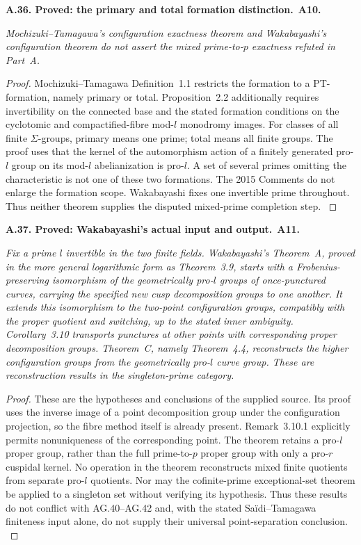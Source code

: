 \documentclass[11pt,a4paper]{article}
\newenvironment{claim}[3]{\par\medskip\noindent\hypertarget{#1}{\textbf{#1. #2.}}\ \textbf{#3.}\par\nopagebreak\smallskip\begingroup\itshape}{\endgroup\par\smallskip}
\begin{document}
\begin{claim}{A.36}{Proved: the primary and total formation distinction}{A10}
Mochizuki--Tamagawa's configuration exactness theorem and Wakabayashi's
configuration theorem do not assert the mixed prime-to-$p$ exactness
refuted in Part~A.
\end{claim}
\begin{proof}
Mochizuki--Tamagawa Definition~1.1 restricts the formation to a
PT-formation, namely primary or total. Proposition~2.2 additionally
requires invertibility on the connected base and the stated formation
conditions on the cyclotomic and compactified-fibre mod-$l$ monodromy
images. For classes of all finite $\Sigma$-groups, primary means one
prime; total means all finite groups. The proof uses that the kernel of
the automorphism action of a finitely generated pro-$l$ group on its
mod-$l$ abelianization is pro-$l$. A set of several primes omitting the
characteristic is not one of these two formations. The 2015 Comments
do not enlarge the formation scope. Wakabayashi fixes one invertible
prime throughout. Thus neither theorem supplies the disputed
mixed-prime completion step.
\citep[Definition~1.1 and Proposition~2.2]{LA_MT2008}
\citep{LA_MT2015,LA_Wakabayashi2016}
\end{proof}

\begin{claim}{A.37}{Proved: Wakabayashi's actual input and output}{A11}
Fix a prime $l$ invertible in the two finite fields. Wakabayashi's
Theorem~A, proved in the more general logarithmic form as Theorem~3.9,
starts with a Frobenius-preserving isomorphism of the geometrically
pro-$l$ groups of once-punctured curves, carrying the specified new
cusp decomposition groups to one another. It extends this isomorphism
to the two-point configuration groups, compatibly with the proper
quotient and switching, up to the stated inner ambiguity. Corollary~3.10
transports punctures at other points with corresponding proper
decomposition groups. Theorem~C, namely Theorem~4.4, reconstructs the
higher configuration groups from the geometrically pro-$l$ curve group.
These are reconstruction results in the singleton-prime category.
\end{claim}
\begin{proof}
These are the hypotheses and conclusions of the supplied source. Its
proof uses the inverse image of a point decomposition group under the
configuration projection, so the fibre method itself is already present.
Remark~3.10.1 explicitly permits nonuniqueness of the corresponding
point. The theorem retains a pro-$l$ proper group, rather than the full
prime-to-$p$ proper group with only a pro-$r$ cuspidal kernel. No operation
in the theorem reconstructs mixed finite quotients from separate
pro-$l$ quotients. Nor may the cofinite-prime exceptional-set theorem
be applied to a singleton set without verifying its hypothesis. Thus
these results do not conflict with AG.40--AG.42 and, with the stated
Sa\"idi--Tamagawa finiteness input alone, do not supply their universal
point-separation conclusion.
\citep[Theorems~3.9,4.4 and Corollary~3.10]{LA_Wakabayashi2016}
\end{proof}
\end{document}
